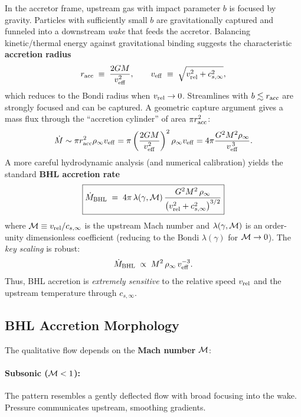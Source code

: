 In the accretor frame, upstream gas with impact parameter $b$ is focused by gravity. Particles with sufficiently small $b$ are gravitationally captured and funneled into a downstream \emph{wake} that feeds the accretor. Balancing kinetic/thermal energy against gravitational binding suggests the characteristic \textbf{accretion radius}
\begin{equation}
    r_{\rm acc} \;\equiv\; \frac{2GM}{v_{\rm eff}^2},
    \qquad
    v_{\rm eff} \;\equiv\; \sqrt{v_{\rm rel}^2 + c_{s,\infty}^2},
    \label{eq:bhl_racc}
\end{equation}
which reduces to the Bondi radius when $v_{\rm rel}\to 0$. Streamlines with $b\lesssim r_{\rm acc}$ are strongly focused and can be captured. A geometric capture argument gives a mass flux through the ``accretion cylinder''
of area $\pi r_{\rm acc}^2$:
\[
\dot M \sim \pi r_{\rm acc}^2 \rho_\infty v_{\rm eff}
= \pi \left(\frac{2GM}{v_{\rm eff}^2}\right)^2 \rho_\infty v_{\rm eff}
= 4\pi \frac{G^2 M^2 \rho_\infty}{v_{\rm eff}^{\,3}}.
\]
A more careful hydrodynamic analysis (and numerical calibration) yields the standard \textbf{BHL accretion rate}
\begin{equation}
    \boxed{
    \dot M_{\rm BHL} \;=\; 4\pi\,\lambda(\gamma,{\cal M})\,
    \frac{G^2 M^2\,\rho_\infty}{\big(v_{\rm rel}^2 + c_{s,\infty}^2\big)^{3/2}}
    }
    \label{eq:bhl_rate}
\end{equation}
where ${\cal M}\equiv v_{\rm rel}/c_{s,\infty}$ is the upstream Mach number and $\lambda(\gamma,{\cal M})$ is an order-unity dimensionless coefficient (reducing to the Bondi $\lambda(\gamma)$ for ${\cal M}\to 0$). The \emph{key scaling} is robust:
\[
\dot M_{\rm BHL} \;\propto\; M^2\,\rho_\infty\,v_{\rm eff}^{-3}.
\]
Thus, BHL accretion is \emph{extremely sensitive} to the relative speed $v_{\rm rel}$ and the upstream temperature through $c_{s,\infty}$.

\subsection{BHL Accretion Morphology}

The qualitative flow depends on the \textbf{Mach number} ${\cal M}$:

\paragraph{Subsonic (${\cal M}<1$):}
The pattern resembles a gently deflected flow with broad focusing into the wake.
Pressure communicates upstream, smoothing gradients.

